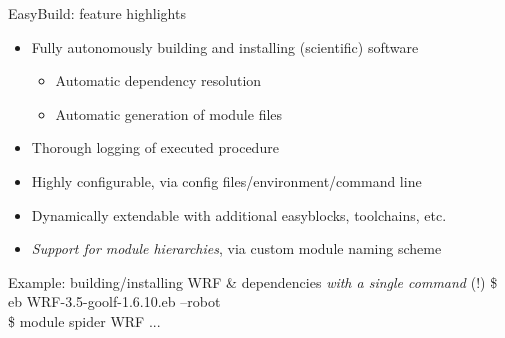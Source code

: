 \documentclass[10pt,xcolor={usenames,dvipsnames}]{beamer}
\begin{document}
\begin{frame}{EasyBuild: feature highlights}
\begin{itemize}
    \item
        Fully autonomously building and installing (scientific) software
        \begin{itemize}
            \item
                Automatic dependency resolution
            \item
                Automatic generation of module files
        \end{itemize}
    \item
        Thorough logging of executed procedure
    \item
        Highly configurable, via config files/environment/command line
    \item
        Dynamically extendable with additional easyblocks, toolchains, etc.
    \item
        \emph{Support for module hierarchies}, via custom module naming scheme
\end{itemize}
\quad\quad
\begin{minipage}{0.9\textwidth}
    \begin{exampleblock}{Example: building/installing WRF \& dependencies \emph{with a single command} (!)}
        \ttfamily
        \$ eb WRF-3.5-goolf-1.6.10.eb --robot\\
        \$ module spider WRF
        ...
    \end{exampleblock}
\end{minipage}
\end{frame}

\end{document}
